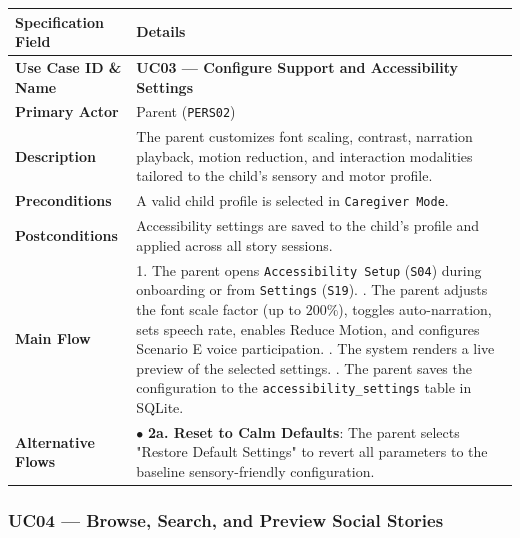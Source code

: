 \noindent\begin{xltabular}{\textwidth}{|p{4.0cm}|X|}
\hline
\textbf{Specification Field} & \textbf{Details} \\ \hline
\endhead
\textbf{Use Case ID \& Name} & \textbf{UC03 — Configure Support and Accessibility Settings} \\ \hline
\textbf{Primary Actor} & Parent (\texttt{PERS02}) \\ \hline
\textbf{Description} & The parent customizes font scaling, contrast, narration playback, motion reduction, and interaction modalities tailored to the child's sensory and motor profile. \\ \hline
\textbf{Preconditions} & A valid child profile is selected in \texttt{Caregiver Mode}. \\ \hline
\textbf{Postconditions} & Accessibility settings are saved to the child's profile and applied across all story sessions. \\ \hline
\textbf{Main Flow} & 1. The parent opens \texttt{Accessibility Setup} (\texttt{S04}) during onboarding or from \texttt{Settings} (\texttt{S19}). . The parent adjusts the font scale factor (up to $200\%$), toggles auto-narration, sets speech rate, enables Reduce Motion, and configures Scenario E voice participation. . The system renders a live preview of the selected settings. . The parent saves the configuration to the \texttt{accessibility\_settings} table in SQLite. \\ \hline
\textbf{Alternative Flows} & $\bullet$ \textbf{2a. Reset to Calm Defaults}: The parent selects "Restore Default Settings" to revert all parameters to the baseline sensory-friendly configuration. \\ \hline
\end{xltabular}



\subsubsection{UC04 — Browse, Search, and Preview Social Stories}


